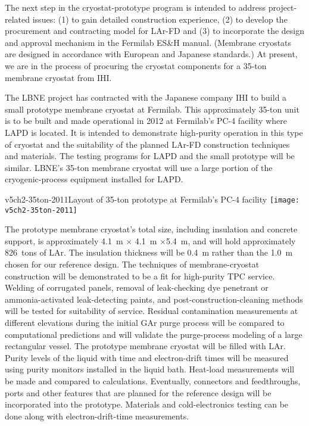 
The next step in the cryostat-prototype program is intended to address project-related issues: (1) to gain detailed construction experience, (2) to develop the procurement and contracting model for LAr-FD and (3) to incorporate the design and approval mechanism in the Fermilab ES\&H manual. (Membrane cryostats are designed in accordance with European and Japanese standards.) At present, we are in the process of procuring the cryostat components for a 35-ton membrane cryostat from IHI.

The LBNE project has contracted with the Japanese company IHI to build a small prototype membrane cryostat at Fermilab.  This approximately 35-ton unit is to be built and made operational in 2012 at Fermilab's PC-4 facility where LAPD is located.  It is intended to demonstrate high-purity operation in this type of cryostat and the suitability of the planned LAr-FD construction techniques and materials.  The testing programs for LAPD and the small prototype will be similar.  LBNE's 35-ton membrane cryostat will use a large portion of the cryogenic-process equipment installed for LAPD.

\begin{cdrfigure}{v5ch2-35ton-2011}{Layout of 35-ton prototype at Fermilab's PC-4 facility}
\texttt{[image: v5ch2-35ton-2011]} 
\end{cdrfigure}

The prototype membrane cryostat's total size, including insulation and concrete support, is approximately 4.1~m $\times$ 4.1~m $\times$5.4~m, and will hold approximately 826~tons of LAr. The insulation thickness will be 0.4~m rather than the 1.0~m chosen for our reference design.  The techniques of membrane-cryostat construction will be demonstrated to be a fit for high-purity TPC service.  Welding of corrugated panels, removal of leak-checking dye penetrant or ammonia-activated leak-detecting paints, and post-construction-cleaning methods will be tested for suitability of service.  Residual contamination measurements at different elevations during the initial GAr purge process will be compared to computational predictions and will validate the purge-process modeling of a large rectangular vessel.  The prototype membrane cryostat will be filled with LAr.  Purity levels of the liquid with time and electron-drift times will be measured using purity monitors installed in the liquid bath.  Heat-load measurements will be made and compared to calculations. Eventually, connectors and feedthroughs, ports and other features that are planned for the reference design will be incorporated into the prototype.  Materials and cold-electronics testing can be done along with electron-drift-time measurements.

